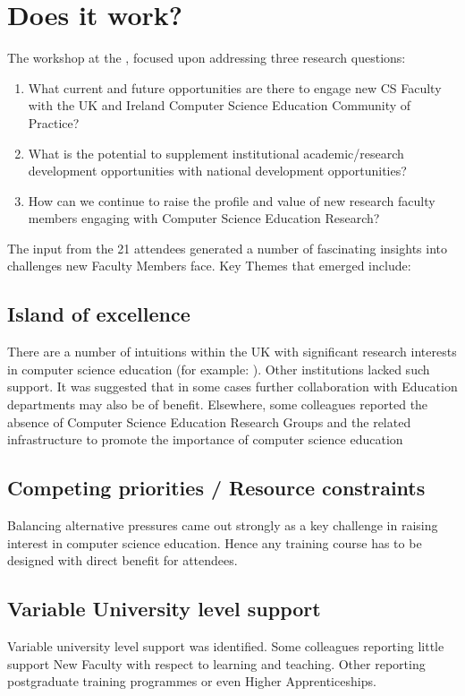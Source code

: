 \documentclass[sigconf]{acmart}
\begin{document}
\section{Does it work?}	
The workshop  at the  , focused upon addressing three research questions:
\begin{enumerate}
\item What current and future opportunities are there to engage new CS Faculty with the UK and Ireland Computer Science Education Community of Practice?
\item What is the potential to supplement institutional academic/research development opportunities with national development opportunities?
\item How can we continue to raise the profile and value of new research faculty members engaging with Computer Science Education Research?
\end{enumerate}
The input from the 21 attendees generated a number of fascinating insights into challenges new Faculty Members face. Key Themes that emerged include:

\subsection{Island of excellence}
There are a number of intuitions within the UK with significant research interests in computer science education (for example: ). Other institutions lacked such support. It was suggested that in some cases further collaboration with Education departments may also be of benefit. Elsewhere, some colleagues reported the absence of Computer Science Education Research Groups and the related infrastructure to promote the importance of computer science education
\subsection{Competing priorities / Resource constraints}
Balancing alternative pressures came out strongly as a key challenge in raising interest in computer science education. Hence any training course has to be designed with direct benefit for attendees. 
\subsection{Variable University level support}
Variable university level support was identified. Some colleagues reporting little support New Faculty with respect to learning and teaching. Other reporting postgraduate training programmes or even Higher Apprenticeships.
\end{document}

